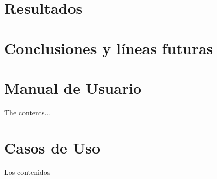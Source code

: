 \documentclass[a4paper, 12pt]{memoir} %
\begin{document}
\chapter{Resultados} \label{chapter:results}


\chapter{Conclusiones y líneas futuras} \label{chapter:concl}


\begin{appendices}
\chapter{Manual de Usuario}
The contents...

\chapter{Casos de Uso}
Los contenidos

\end{appendices}

\glsaddall %

\end{document}
